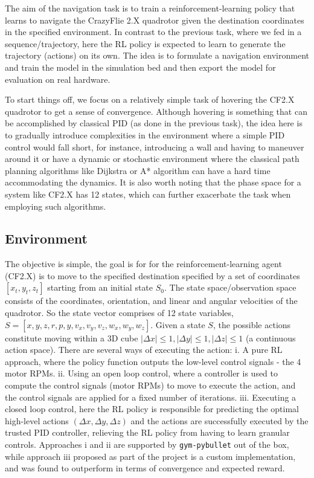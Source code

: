 \documentclass[../templateLTHtwocol.tex]{subfiles}
\begin{document}
The aim of the navigation task is to train a reinforcement-learning policy that learns to navigate the CrazyFlie 2.X quadrotor given the destination coordinates in the specified environment. In contrast to the previous task, where we fed in a sequence/trajectory, here the RL policy is expected to learn to generate the trajectory (actions) on its own. The idea is to formulate a navigation environment and train the model in the simulation bed and then export the model for evaluation on real hardware.

To start things off, we focus on a relatively simple task of hovering the CF2.X quadrotor to get a sense of convergence. Although hovering is something that can be accomplished by classical PID (as done in the previous task), the idea here is to gradually introduce complexities in the environment where a simple PID control would fall short, for instance, introducing a wall and having to maneuver around it or have a dynamic or stochastic environment where the classical path planning algorithms like Dijkstra or A* algorithm can have a hard time accommodating the dynamics. It is also worth noting that the phase space for a system like CF2.X has 12 states, which can further exacerbate the task when employing such algorithms. 

\subsection{Environment}

The objective is simple, the goal is for for the reinforcement-learning agent (CF2.X) is to move to the specified destination specified by a set of coordinates $[x_t, y_t, z_t]$ starting from an initial state $S_0$. The state space/observation space consists of the coordinates, orientation, and linear and angular velocities of the quadrotor. So the state vector comprises of 12 state variables, $S = [x, y, z, r, p, y, v_x, v_y, v_z, w_x, w_y, w_z]$. Given a state $S$, the possible actions constitute moving within a 3D cube $|\Delta x| \le 1, |\Delta y| \le 1, |\Delta z| \le 1$ (a continuous action space). There are several ways of executing the action: i. A pure RL approach, where the policy function outputs the low-level control signals - the 4 motor RPMs. ii. Using an open loop control, where a controller is used to compute the control signals (motor RPMs) to move to execute the action, and the control signals are applied for a fixed number of iterations. iii. Executing a closed loop control, here the RL policy is responsible for predicting the optimal high-level actions $(\Delta x, \Delta y, \Delta z)$ and the actions are successfully executed by the trusted PID controller, relieving the RL policy from having to learn granular controls. Approaches i and ii are supported by \verb|gym-pybullet| out of the box, while approach iii proposed as part of the project is a custom implementation, and was found to outperform in terms of convergence and expected reward.
\end{document}
